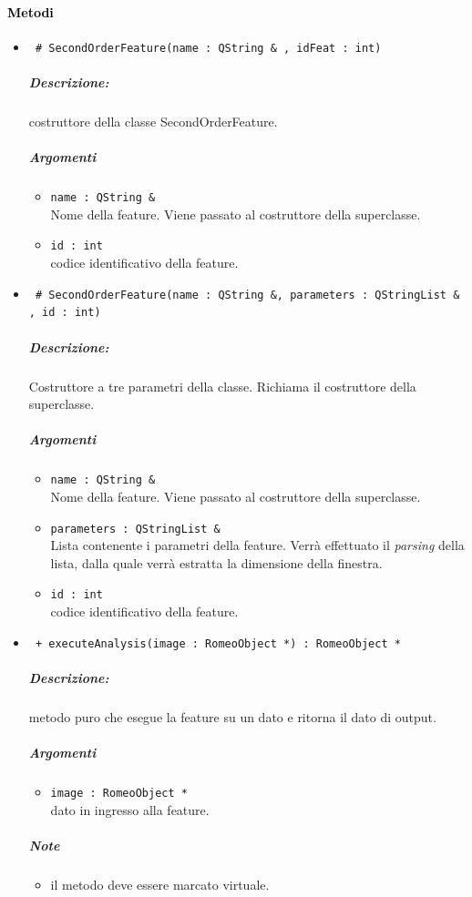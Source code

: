 \paragraph{\textcolor{black}{Metodi\\}}
	\begin{itemize}
	\item \color{blue}\verb! # SecondOrderFeature(name : QString & , idFeat : int)!
		\color{black}
		\subparagraph{Descrizione:} costruttore della classe SecondOrderFeature.
		\subparagraph{Argomenti}
			\begin{itemize}
				\item \color{RoyalPurple} \verb!name : QString &! \\ 
				\color{black} Nome della feature. Viene passato al costruttore della superclasse.	
				\item \color{RoyalPurple} \verb!id : int! \\ 
				\color{black} codice identificativo della feature\g{}.	
			\end{itemize}
			
	\item \color{blue}\verb! # SecondOrderFeature(name : QString &, parameters : QStringList & , id : int)!
		\color{black}
		\subparagraph{Descrizione:} Costruttore a tre parametri della classe. Richiama il costruttore della 						superclasse.
		\subparagraph{Argomenti}
			\begin{itemize}
				\item \color{RoyalPurple} \verb!name : QString &! \\ 
				\color{black} Nome della feature. Viene passato al costruttore della superclasse.	
				\item \color{RoyalPurple} \verb!parameters : QStringList &! \\ 
				\color{black} Lista contenente i parametri della feature\g{}. Verrà effettuato il \textit{parsing} 						della lista, dalla quale verrà estratta la dimensione della finestra.
				\item \color{RoyalPurple} \verb!id : int! \\ 
				\color{black} codice identificativo della feature\g{}.	
			\end{itemize}
			
	\item \color{blue}\verb! + executeAnalysis(image : RomeoObject *) : RomeoObject *!
		\color{black}
		\subparagraph{Descrizione:} metodo puro che esegue la feature su un dato e ritorna il dato di output.
		\subparagraph{Argomenti}
			\begin{itemize}
				\item \color{RoyalPurple} \verb!image : RomeoObject * ! \\ 
				\color{black} dato in ingresso alla feature.		
			\end{itemize}
		\subparagraph{Note}
			\begin{itemize}
				\item il metodo deve essere marcato virtuale.
			\end{itemize}
						

\end{itemize}
